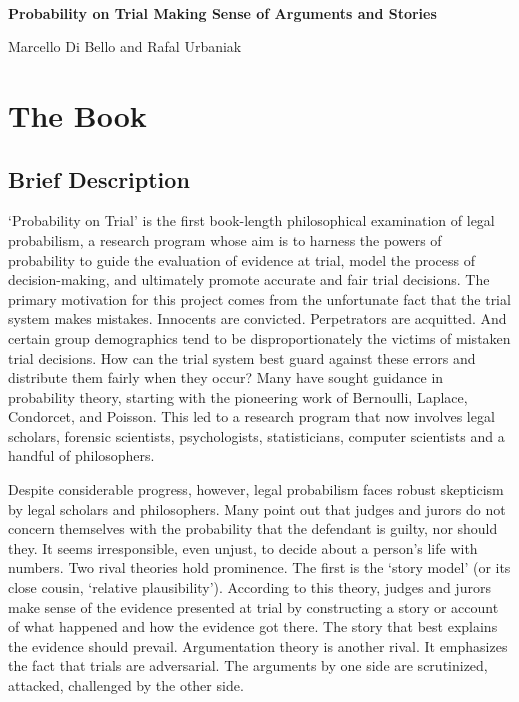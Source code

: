 \documentclass[
  10pt,
  dvipsnames,enabledeprecatedfontcommands]{scrartcl}
\author{}
\date{\vspace{-2.5em}}
\begin{document}
\begin{center}

$\, $

\vspace{-10mm}

\textbf{\huge  Probability on Trial \linebreak \normalsize  Making Sense of Arguments and Stories}
\vspace{1mm}

Marcello Di Bello and Rafal Urbaniak
\end{center}

\vspace{-6mm}

\hypertarget{the-book}{%
\section{The Book}\label{the-book}}

\vspace{-2mm}

\hypertarget{brief-description}{%
\subsection{Brief Description}\label{brief-description}}

\normalsize

`Probability on Trial' is the first book-length philosophical
examination of legal probabilism, a research program whose aim is to
harness the powers of probability to guide the evaluation of evidence at
trial, model the process of decision-making, and ultimately promote
accurate and fair trial decisions. The primary motivation for this
project comes from the unfortunate fact that the trial system makes
mistakes. Innocents are convicted. Perpetrators are acquitted. And
certain group demographics tend to be disproportionately the victims of
mistaken trial decisions. How can the trial system best guard against
these errors and distribute them fairly when they occur? Many have
sought guidance in probability theory, starting with the pioneering work
of Bernoulli, Laplace, Condorcet, and Poisson. This led to a research
program that now involves legal scholars, forensic scientists,
psychologists, statisticians, computer scientists and a handful of
philosophers.

Despite considerable progress, however, legal probabilism faces robust
skepticism by legal scholars and philosophers. Many point out that
judges and jurors do not concern themselves with the probability that
the defendant is guilty, nor should they. It seems irresponsible, even
unjust, to decide about a person's life with numbers. Two rival theories
hold prominence. The first is the `story model' (or its close cousin,
`relative plausibility'). According to this theory, judges and jurors
make sense of the evidence presented at trial by constructing a story or
account of what happened and how the evidence got there. The story that
best explains the evidence should prevail. Argumentation theory is
another rival. It emphasizes the fact that trials are adversarial. The
arguments by one side are scrutinized, attacked, challenged by the other
side.
\end{document}
